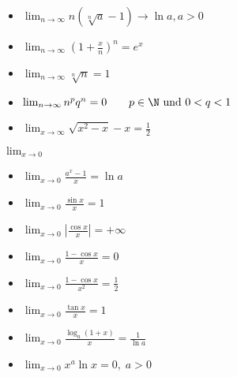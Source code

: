 \begin{itemize}[leftmargin=*]
	\item $\lim_{n \to \infty} n(\sqrt[n]{a} - 1) \rightarrow \ln a, a > 0$
	\item $\lim_{n \to \infty} \left( 1+\frac{x}{n} \right)^n = e^x \quad$
	\item $\lim_{n \to \infty} \sqrt[n]{n} = 1$
	\item $\lim_{n \to \infty} n^p q^n = 0 \qquad p \in \N \text{ und } 0 < q < 1$
	\item $\lim_{x \to \infty} \sqrt{x^2-x}-x = \frac{1}{2}$ 
\end{itemize}
$\lim_{x \to 0}$
\begin{itemize}[leftmargin=*]
	\item $\lim_{x \to 0} \frac{a^x - 1}{x} = \ln a$
	\item $\lim_{x \to 0} \frac{\sin x}{x} = 1$
	\item $\lim_{x \to 0} \left| \frac{\cos x}{x} \right| = +\infty$
	\item $\lim_{x \to 0} \frac{1 - \cos x}{x} = 0$
	\item $\lim_{x \to 0} \frac{1 - \cos x}{x^2} = \frac{1}{2}$
	\item $\lim_{x \to 0} \frac{\tan x}{x} = 1$
	\item $\lim_{x \to 0} \frac{\log_a (1 + x)}{x} = \frac{1}{\ln a}$
	\item $\lim_{x \to 0} x^a \ln x = 0, \; a  > 0$
\end{itemize}

